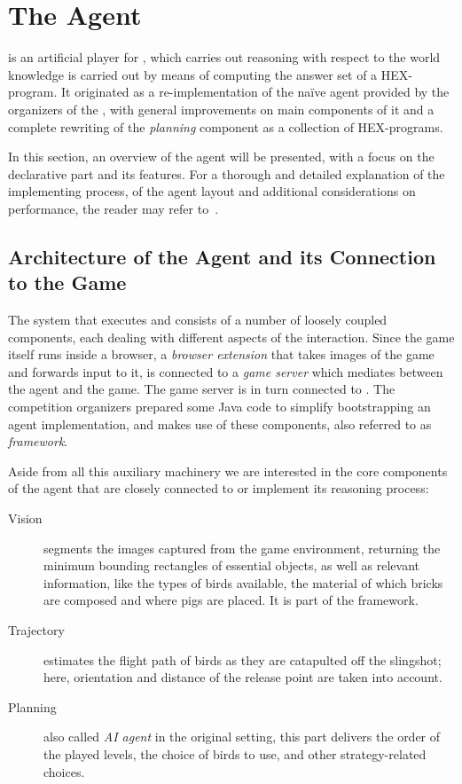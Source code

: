 \section{The \ah Agent}
\label{sec:agent}
\ah is an artificial player for \ab,
which carries out reasoning with respect to
the world knowledge is carried out by
means of computing the answer set of a
HEX-program.
It originated as a re-implementation of
the na\"{i}ve agent provided by the organizers
of the \abc \cite{angryAI},
with general improvements on main components
of it and a complete rewriting of the
\emph{planning} component as a collection
of HEX-programs.

In this section, an overview of the \ah
agent will be presented, with a focus on
the declarative part and its features. 
For a thorough and detailed explanation of
the implementing process, of the agent
layout and additional considerations on
performance, the reader may refer to~\cite{angryhex}.

\subsection{Architecture of the Agent and its Connection to the Game}
\label{sec:agent_base}

The system that executes \ah and \ab consists of a
number of loosely coupled components,
each dealing with different aspects of the interaction.
Since the game itself runs inside a browser, a
\emph{browser extension} that takes images of the game
and forwards input to it, is connected to a \emph{game server}
which mediates between the agent and the game. The game server
is in turn connected to \ah.
The competition organizers prepared some Java code to
simplify bootstrapping an agent implementation, and \ah
makes use of these components, also referred to as \emph{framework}.

Aside from all this auxiliary machinery we are interested in
the core components of the agent that are closely connected to
or implement its reasoning process:
\begin{description}
    \item[Vision] segments the images
    captured from the game environment, returning
    the minimum bounding rectangles of essential
    objects, as well as relevant information,
    like the types of birds available, the material
    of which bricks are composed and where pigs are placed.
    It is part of the framework.
    \item[Trajectory] estimates
    the flight path of birds as they are
    catapulted off the slingshot; here, orientation and distance of
    the release point are taken into account.
    \item[Planning] also called \emph{AI agent} in the
    original setting, this part delivers the order
    of the played levels, the choice of birds to use,
    and other strategy-related choices.
\end{description}

